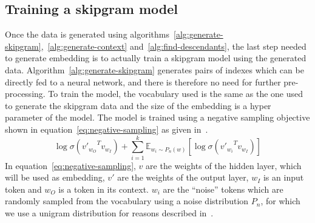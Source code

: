 \subsection{Training a skipgram model}
Once the data is generated using
algorithms~\ref{alg:generate-skipgram},~\ref{alg:generate-context}
and~\ref{alg:find-descendants}, the last step needed to generate embedding is to
actually train a skipgram model using the generated data.
Algorithm~\ref{alg:generate-skipgram} generates pairs of indexes which can be
directly fed to a neural network, and there is therefore no need for further
pre-processing. To train the model, the vocabulary used is the same as the one
used to generate the skipgram data and the size of the embedding is a hyper
parameter of the model. The model is trained using a negative sampling objective
shown in equation~\ref{eq:negative-sampling} as given
in~\cite{DBLP:journals/corr/MikolovSCCD13}.
%
\begin{equation}
  \label{eq:negative-sampling}
  \log \sigma \left({v'_{w_O}}^T v_{w_I} \right) + \sum_{i=1}^k \mathbb{E}_{w_i \sim P_n(w)}
  \left[ \log \sigma\left( {v'_{w_i}}^T v_{w_I} \right) \right]
\end{equation}
%
In equation~\ref{eq:negative-sampling}, $v$ are the weights of the hidden
layer, which will be used as embedding, $v'$ are the weights of the output
layer, $w_I$ is an input token and $w_O$ is a token in its context. $w_i$ are
the ``noise'' tokens which are randomly sampled from the vocabulary using a
noise distribution $P_n$, for which we use a unigram distribution for reasons
described in~\cite{DBLP:journals/corr/MikolovSCCD13}.
